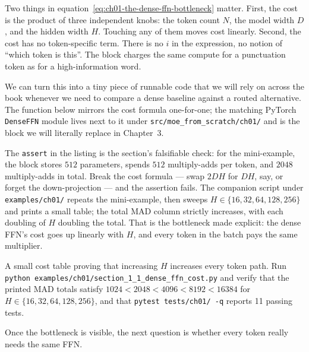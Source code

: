 

Two things in equation~\ref{eq:ch01-the-dense-ffn-bottleneck} matter. First, the cost is the product of three independent knobs: the token count $N$, the model width $D$, and the hidden width $H$. Touching any of them moves cost linearly. Second, the cost has no token-specific term. There is no $i$ in the expression, no notion of ``which token is this''. The block charges the same compute for a punctuation token as for a high-information word.

We can turn this into a tiny piece of runnable code that we will rely on across the book whenever we need to compare a dense baseline against a routed alternative. The function below mirrors the cost formula one-for-one; the matching PyTorch \texttt{DenseFFN} module lives next to it under \texttt{src/moe\_from\_scratch/ch01/} and is the block we will literally replace in Chapter~3.



The \texttt{assert} in the listing is the section's falsifiable check: for the mini-example, the block stores $512$ parameters, spends $512$ multiply-adds per token, and $2048$ multiply-adds in total. Break the cost formula --- swap $2 D H$ for $D H$, say, or forget the down-projection --- and the assertion fails. The companion script under \texttt{examples/ch01/} repeats the mini-example, then sweeps $H \in \{16, 32, 64, 128, 256\}$ and prints a small table; the total MAD column strictly increases, with each doubling of $H$ doubling the total. That is the bottleneck made explicit: the dense FFN's cost goes up linearly with $H$, and every token in the batch pays the same multiplier.

\begin{checkpointbox}
A small cost table proving that increasing $H$ increases every token path. Run \texttt{python examples/ch01/section\_1\_1\_dense\_ffn\_cost.py} and verify that the printed MAD totals satisfy $1024 < 2048 < 4096 < 8192 < 16384$ for $H \in \{16, 32, 64, 128, 256\}$, and that \texttt{pytest tests/ch01/ -q} reports 11 passing tests.
\end{checkpointbox}

Once the bottleneck is visible, the next question is whether every token really needs the same FFN.
